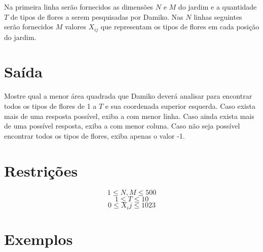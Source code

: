 \documentclass{article}
\begin{document}
Na primeira linha serão fornecidos as dimensões $N$ e $M$ do jardim e a quantidade $T$ de tipos de flores a serem pesquisadas por Damiko. Nas $N$ linhas seguintes serão fornecidos $M$ valores $X_{ij}$ que representam os tipos de flores em cada posição do jardim.

\section*{Saída}

Mostre qual a menor área quadrada que Damiko deverá analisar para encontrar todos os tipos de flores de 1 a $T$ e sua coordenada superior esquerda. Caso exista mais de uma resposta possível, exiba a com menor linha. Caso ainda exista mais de uma possível resposta, exiba a com menor coluna. Caso não seja possível encontrar todos os tipos de flores, exiba apenas o valor -1.

\section*{Restrições}

$$1 \leq N,M \leq 500$$
$$1 \leq T \leq 10$$
$$0 \leq X_ij \leq 1023$$

\section*{Exemplos}
\exemplo
\end{document}
